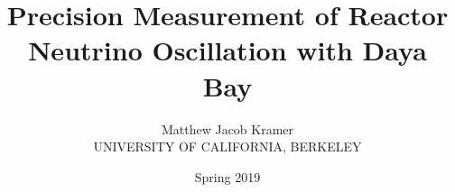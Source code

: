 \documentclass[11pt]{memoir}
\title{Precision Measurement of Reactor Neutrino Oscillation with Daya Bay}
\author{Matthew Jacob Kramer\\
UNIVERSITY OF CALIFORNIA, BERKELEY}
\date{Spring 2019}
\begin{document}
\nocite{*}

\frontmatter

\begin{titlingpage}
  \maketitle
\end{titlingpage}

\tableofcontents{}

\mainmatter



\backmatter

\printbibliography
\end{document}
